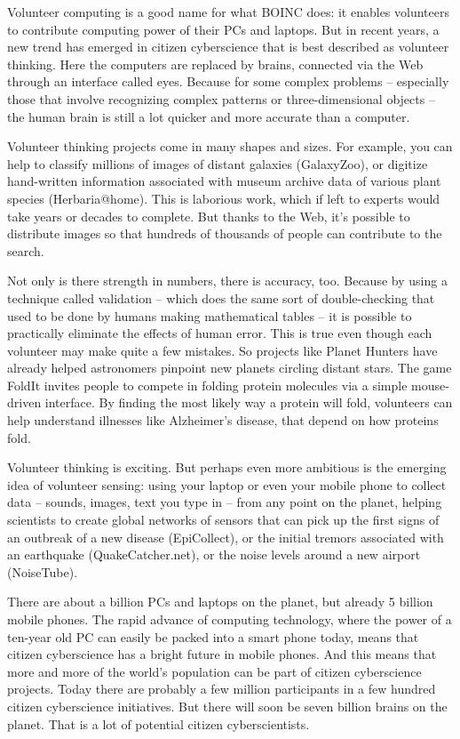 Volunteer computing is a good name for what BOINC does: it enables volunteers to contribute computing power of their PCs and laptops. But in recent years, a new trend has emerged in citizen cyberscience that is best described as volunteer thinking. Here the computers are replaced by brains, connected via the Web through an interface called eyes. Because for some complex problems – especially those that involve recognizing complex patterns or three-dimensional objects – the human brain is still a lot quicker and more accurate than a computer.

Volunteer thinking projects come in many shapes and sizes. For example, you can help to classify millions of images of distant galaxies (GalaxyZoo), or digitize hand-written information associated with museum archive data of various plant species (Herbaria@home).  This is laborious work, which if left to experts would take years or decades to complete. But thanks to the Web, it’s possible to distribute images so that hundreds of thousands of people can contribute to the search. 

Not only is there strength in numbers, there is accuracy, too. Because by using a technique called validation – which does the same sort of double-checking that used to be done by humans making mathematical tables – it is possible to practically eliminate the effects of human error. This is true even though each volunteer may make quite a few mistakes. So projects like Planet Hunters have already helped astronomers pinpoint new planets circling distant stars. The game FoldIt invites people to compete in folding protein molecules via a simple mouse-driven interface. By finding the most likely way a protein will fold, volunteers can help understand illnesses like Alzheimer’s disease, that depend on how proteins fold. 

Volunteer thinking is exciting. But perhaps even more ambitious is the emerging idea of volunteer sensing: using  your laptop or even your mobile phone to collect data – sounds, images, text you type in – from any point on the planet, helping scientists to create global networks of sensors that can pick up the first signs of an outbreak of a new disease (EpiCollect), or the initial tremors associated with an earthquake (QuakeCatcher.net), or the noise levels around a new airport (NoiseTube).

There are about a billion PCs and laptops on the planet, but already 5 billion mobile phones. The rapid advance of computing technology, where the power of a ten-year old PC can easily be packed into a smart phone today, means that citizen cyberscience has a bright future in mobile phones. And this means that more and more of the world’s population can be part of citizen cyberscience projects. Today there are probably a few million participants in a few hundred citizen cyberscience initiatives. But there will soon be seven billion brains on the planet. That is a lot of potential citizen cyberscientists. 

